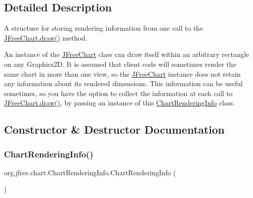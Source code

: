 \subsection{Detailed Description}
A structure for storing rendering information from one call to the \mbox{\hyperlink{classorg_1_1jfree_1_1chart_1_1_j_free_chart_a319d136fc007faada9be1db3005a55cd}{J\+Free\+Chart.\+draw()}} method. 

An instance of the \mbox{\hyperlink{classorg_1_1jfree_1_1chart_1_1_j_free_chart}{J\+Free\+Chart}} class can draw itself within an arbitrary rectangle on any {\ttfamily Graphics2D}. It is assumed that client code will sometimes render the same chart in more than one view, so the \mbox{\hyperlink{classorg_1_1jfree_1_1chart_1_1_j_free_chart}{J\+Free\+Chart}} instance does not retain any information about its rendered dimensions. This information can be useful sometimes, so you have the option to collect the information at each call to {\ttfamily \mbox{\hyperlink{classorg_1_1jfree_1_1chart_1_1_j_free_chart_a319d136fc007faada9be1db3005a55cd}{J\+Free\+Chart.\+draw()}}}, by passing an instance of this {\ttfamily \mbox{\hyperlink{classorg_1_1jfree_1_1chart_1_1_chart_rendering_info}{Chart\+Rendering\+Info}}} class. 

\subsection{Constructor \& Destructor Documentation}
\mbox{\label{classorg_1_1jfree_1_1chart_1_1_chart_rendering_info_aad79afd960519b122dd46da5cb9e4c40}} 
\subsubsection{\texorpdfstring{Chart\+Rendering\+Info()}{ChartRenderingInfo()}\hspace{0.1cm}{\footnotesize\ttfamily [1/2]}}
{\footnotesize\ttfamily org.\+jfree.\+chart.\+Chart\+Rendering\+Info.\+Chart\+Rendering\+Info (\begin{DoxyParamCaption}{ }\end{DoxyParamCaption})}

